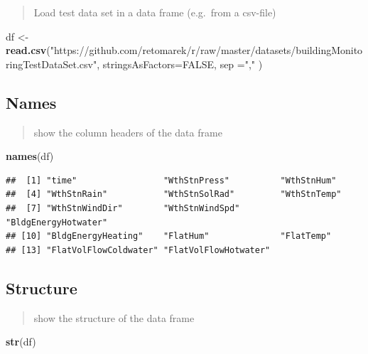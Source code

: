 \documentclass[
]{book}
\newenvironment{Shaded}{\begin{snugshade}}{\end{snugshade}}
\newcommand{\DataTypeTok}[1]{\textcolor[rgb]{0.13,0.29,0.53}{#1}}
\newcommand{\KeywordTok}[1]{\textcolor[rgb]{0.13,0.29,0.53}{\textbf{#1}}}
\newcommand{\NormalTok}[1]{#1}
\newcommand{\OtherTok}[1]{\textcolor[rgb]{0.56,0.35,0.01}{#1}}
\newcommand{\StringTok}[1]{\textcolor[rgb]{0.31,0.60,0.02}{#1}}
\begin{document}
\begin{quote}
Load test data set in a data frame (e.g.~from a csv-file)
\end{quote}

\begin{Shaded}
\begin{Highlighting}[]
\NormalTok{df <-}\StringTok{ }\KeywordTok{read.csv}\NormalTok{(}\StringTok{"https://github.com/retomarek/r/raw/master/datasets/buildingMonitoringTestDataSet.csv"}\NormalTok{, }\DataTypeTok{stringsAsFactors=}\OtherTok{FALSE}\NormalTok{, }\DataTypeTok{sep =}\StringTok{","}\NormalTok{ )}
\end{Highlighting}
\end{Shaded}

\hypertarget{names}{%
\subsection{Names}\label{names}}

\begin{quote}
show the column headers of the data frame
\end{quote}

\begin{Shaded}
\begin{Highlighting}[]
\KeywordTok{names}\NormalTok{(df)}
\end{Highlighting}
\end{Shaded}

\begin{verbatim}
##  [1] "time"                 "WthStnPress"          "WthStnHum"           
##  [4] "WthStnRain"           "WthStnSolRad"         "WthStnTemp"          
##  [7] "WthStnWindDir"        "WthStnWindSpd"        "BldgEnergyHotwater"  
## [10] "BldgEnergyHeating"    "FlatHum"              "FlatTemp"            
## [13] "FlatVolFlowColdwater" "FlatVolFlowHotwater"
\end{verbatim}

\hypertarget{structure}{%
\subsection{Structure}\label{structure}}

\begin{quote}
show the structure of the data frame
\end{quote}

\begin{Shaded}
\begin{Highlighting}[]
\KeywordTok{str}\NormalTok{(df)}
\end{Highlighting}
\end{Shaded}
\end{document}
